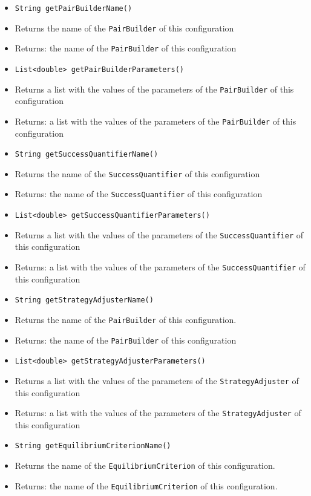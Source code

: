 \documentclass[parskip=full,11pt]{scrartcl}
\begin{document}
\begin{itemize}
	\item \texttt{String getPairBuilderName()}
	\item[] Returns the name of the \texttt{PairBuilder} of this configuration
	\item[] Returns: the name of the \texttt{PairBuilder} of this configuration

	\item \texttt{List<double> getPairBuilderParameters()}
	\item[] Returns a list with the values of the parameters of the \texttt{PairBuilder} of this configuration
	\item[] Returns: a list with the values of the parameters of the \texttt{PairBuilder} of this configuration

	\item \texttt{String getSuccessQuantifierName()}
	\item[] Returns the name of the \texttt{SuccessQuantifier} of this configuration
	\item[] Returns: the name of the \texttt{SuccessQuantifier} of this configuration

	\item \texttt{List<double> getSuccessQuantifierParameters()}
	\item[] Returns a list with the values of the parameters of the \texttt{SuccessQuantifier} of this configuration
	\item[] Returns: a list with the values of the parameters of the \texttt{SuccessQuantifier} of this configuration

	\item \texttt{String getStrategyAdjusterName()}
	\item[] Returns the name of the \texttt{PairBuilder} of this configuration.
	\item[] Returns: the name of the \texttt{PairBuilder} of this configuration

	\item \texttt{List<double> getStrategyAdjusterParameters()}
	\item[] Returns a list with the values of the parameters of the \texttt{StrategyAdjuster} of this configuration
	\item[] Returns: a list with the values of the parameters of the \texttt{StrategyAdjuster} of this configuration


	\item \texttt{String getEquilibriumCriterionName()}
	\item[] Returns the name of the \texttt{EquilibriumCriterion} of this configuration.
	\item[] Returns: the name of the \texttt{EquilibriumCriterion} of this configuration.


\end{itemize}
\end{document}
